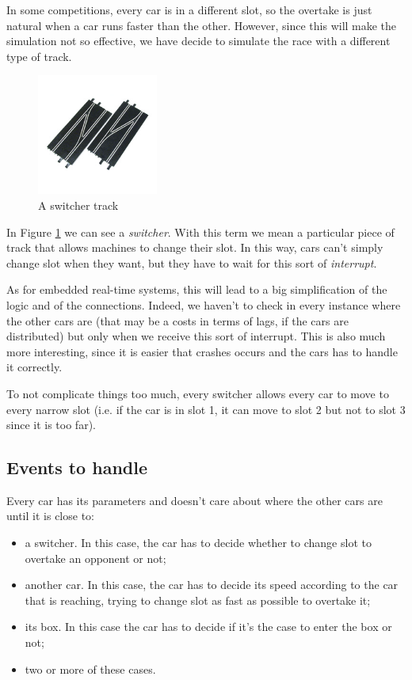In some competitions, every car is in a different slot, so the overtake is just natural when a car runs faster than the other. However, since this will make the simulation not so effective, we have decide to simulate the race with a different type of track.

\begin{figure}[H]
\centering %
\includegraphics[width=150px]{./img/switcher.jpg}
\caption{A switcher track}
\label{fig:switcher}
\end{figure}

In Figure \ref{fig:switcher} we can see a \textit{switcher}. With this term we mean a particular piece of track that allows machines to change their slot. In this way, cars can't simply change slot when they want, but they have to wait for this sort of \textit{interrupt}. 

As for embedded real-time systems, this will lead to a big simplification of the logic and of the connections. Indeed, we haven't to check in every instance where the other cars are (that may be a costs in terms of lags, if the cars are distributed) but only when we receive this sort of interrupt. This is also much more interesting, since it is easier that crashes occurs and the cars has to handle it correctly.

To not complicate things too much, every switcher allows every car to move to every narrow slot (i.e. if the car is in slot 1, it can move to slot 2 but not to slot 3 since it is too far).

\subsection{Events to handle}

Every car has its parameters and doesn't care about where the other cars are until it is close to:
\begin{itemize}
\item a switcher. In this case, the car has to decide whether to change slot to overtake an opponent or not;
\item another car. In this case, the car has to decide its speed according to the car that is reaching, trying to change slot as fast as possible to overtake it;
\item its box. In this case the car has to decide if it's the case to enter the box or not;
\item two or more of these cases.
\end{itemize}

